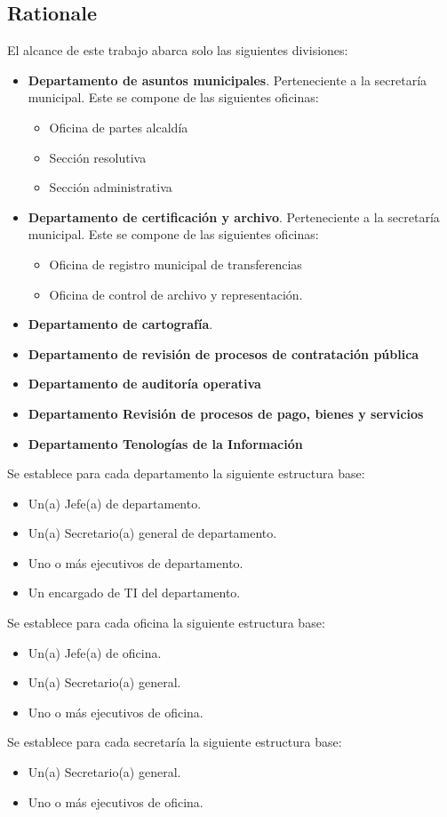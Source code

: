 \subsection{Rationale}
El alcance de este trabajo abarca solo las siguientes divisiones:
\begin{itemize}
	\item {
		\textbf{Departamento de asuntos municipales}. Perteneciente a la secretaría municipal. Este se compone de las siguientes oficinas:
		\begin{itemize}
			\item Oficina de partes alcaldía
			\item Sección resolutiva
			\item Sección administrativa
		\end{itemize}
	}
	\item {
		\textbf{Departamento de certificación y archivo}.  Perteneciente a la secretaría municipal. Este se compone de las siguientes oficinas:
		\begin{itemize}
			\item Oficina de registro municipal de transferencias
			\item Oficina de control de archivo y representación.
		\end{itemize}
	}
	\item {
		\textbf{Departamento de cartografía}.
	}
	\item {
		\textbf{Departamento de revisión de procesos de contratación pública}
	}
	\item {
		\textbf{Departamento de auditoría operativa}
	}
	\item {
		\textbf{Departamento Revisión de procesos de pago, bienes y servicios}
	}
	\item {
		\textbf{Departamento Tenologías de la Información}
	}
\end{itemize}

Se establece para cada departamento la siguiente estructura base:
\begin{itemize}
	\item Un(a) Jefe(a) de departamento.
	\item Un(a) Secretario(a) general de departamento.
	\item Uno o más ejecutivos de departamento.
	\item Un encargado de TI del departamento.
\end{itemize}


Se establece para cada oficina la siguiente estructura base:
\begin{itemize}
	\item Un(a) Jefe(a) de oficina.
	\item Un(a) Secretario(a) general.
	\item Uno o más ejecutivos de oficina.
\end{itemize}

Se establece para cada secretaría la siguiente estructura base:
\begin{itemize}
	\item Un(a) Secretario(a) general.
	\item Uno o más ejecutivos de oficina.
\end{itemize}

